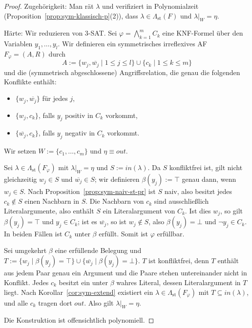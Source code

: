 \begin{proof}
    Zugehörigkeit: Man rät \(\lambda\) und verifiziert in Polynomialzeit
    (Proposition~\ref{prop:sym-klassisch-p}(2)), dass
    \(\lambda\in\Lambda_{\mathrm{st}}(F)\) und \(\lambda|_W=\eta\).

    Härte: Wir reduzieren von 3-SAT. Sei \(\varphi=\bigwedge_{k=1}^{m}C_k\) eine
    KNF-Formel über den Variablen \(y_1,\dots,y_l\). Wir definieren ein
    symmetrisches irreflexives AF \(F_\varphi=(A,R)\) durch
    \[
        A:=\{w_j,\overline{w_j}\mid 1\leq j\leq l\}\cup\{c_k\mid 1\leq k\leq m\}
    \]
    und die (symmetrisch abgeschlossene) Angriffsrelation, die genau die
    folgenden Konflikte enthält:
    \begin{itemize}
        \item \(\{w_j,\overline{w_j}\}\) für jedes \(j\),
        \item \(\{w_j,c_k\}\), falls \(y_j\) positiv in \(C_k\) vorkommt,
        \item \(\{\overline{w_j},c_k\}\), falls \(y_j\) negativ in \(C_k\)
        vorkommt.
    \end{itemize}
    Wir setzen \(W:=\{c_1,\dots,c_m\}\) und \(\eta\equiv\mathit{out}\).

    Sei \(\lambda\in\Lambda_{\mathrm{st}}(F_\varphi)\) mit \(\lambda|_W=\eta\)
    und \(S:=\mathit{in}(\lambda)\). Da \(S\) konfliktfrei ist, gilt nicht
    gleichzeitig \(w_j\in S\) und \(\overline{w_j}\in S\); wir definieren
    \(\beta(y_j):=\top\) genau dann, wenn \(w_j\in S\). Nach
    Proposition~\ref{prop:sym-naiv-st-pr} ist \(S\) naiv, also besitzt jedes
    \(c_k\notin S\) einen Nachbarn in \(S\). Die Nachbarn von \(c_k\) sind
    ausschließlich Literalargumente, also enthält \(S\) ein Literalargument von
    \(C_k\). Ist dies \(w_j\), so gilt \(\beta(y_j)=\top\) und \(y_j\in C_k\);
    ist es \(\overline{w_j}\), so ist \(w_j\notin S\), also
    \(\beta(y_j)=\bot\) und \(\neg y_j\in C_k\). In beiden Fällen ist \(C_k\)
    unter \(\beta\) erfüllt. Somit ist \(\varphi\) erfüllbar.

    Sei umgekehrt \(\beta\) eine erfüllende Belegung und
    \(T:=\{w_j\mid\beta(y_j)=\top\}\cup\{\overline{w_j}\mid\beta(y_j)=\bot\}\).
    \(T\) ist konfliktfrei, denn \(T\) enthält aus jedem Paar genau ein
    Argument und die Paare stehen untereinander nicht in Konflikt. Jedes
    \(c_k\) besitzt ein unter \(\beta\) wahres Literal, dessen Literalargument
    in \(T\) liegt. Nach Korollar~\ref{cor:sym-extend} existiert ein
    \(\lambda\in\Lambda_{\mathrm{st}}(F_\varphi)\) mit
    \(T\subseteq\mathit{in}(\lambda)\), und alle \(c_k\) tragen dort
    \(\mathit{out}\). Also gilt \(\lambda|_W=\eta\).

    Die Konstruktion ist offensichtlich polynomiell.
\end{proof}

